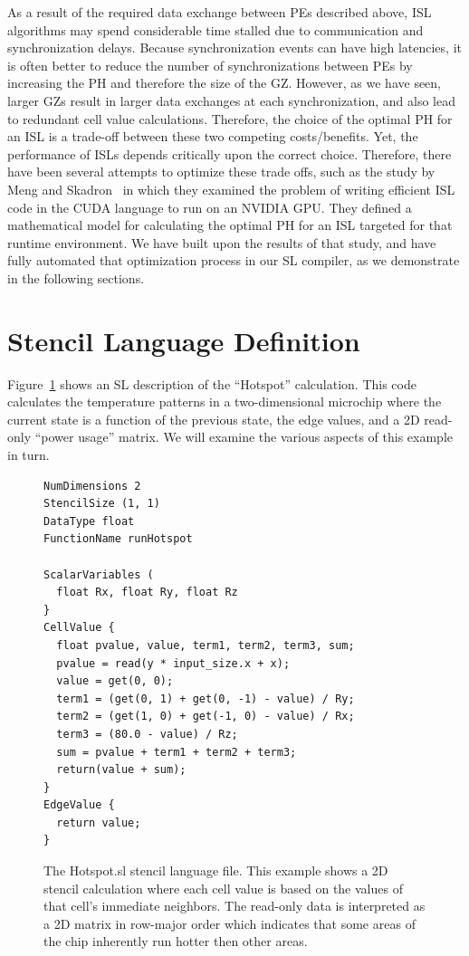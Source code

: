 \documentclass[preprint,nocopyrightspace]{styles/sigplanconf}
\begin{document}
As a result of the required data exchange between PEs described above, ISL
algorithms may spend considerable time stalled due to communication and
synchronization delays.  Because synchronization events can have high
latencies, it is often better to reduce the number of synchronizations between
PEs by increasing the PH and therefore the size of the GZ.  However, as we have
seen, larger GZs result in larger data exchanges at each synchronization, and
also lead to redundant cell value calculations.  Therefore, the choice of the optimal PH
for an ISL is a trade-off between these two competing costs/benefits.  Yet, the
performance of ISLs depends critically upon the correct choice.  Therefore, 
there have been several attempts to optimize these trade offs, such as the 
study by Meng and Skadron~\cite{meng} in which they examined the
problem of writing efficient ISL code in the CUDA language to run on an NVIDIA
GPU.  They defined a mathematical model for calculating the optimal PH for an
ISL targeted for that runtime environment.  We have built upon the results of that
study, and have fully automated that optimization process in our SL compiler, 
as we demonstrate in the following sections. 

\section{Stencil Language Definition}

Figure~\ref{fig:hotspot} shows an SL description of the ``Hotspot''
calculation.  This code calculates the temperature patterns in a
two-dimensional microchip where the current state is a function of the previous
state, the edge values, and a 2D read-only ``power usage'' matrix.
We will examine the various aspects of this example in turn.

\begin{figure}
\begin{footnotesize}
\begin{verbatim}
NumDimensions 2
StencilSize (1, 1)
DataType float
FunctionName runHotspot

ScalarVariables (
  float Rx, float Ry, float Rz
}
CellValue {
  float pvalue, value, term1, term2, term3, sum;
  pvalue = read(y * input_size.x + x);
  value = get(0, 0);
  term1 = (get(0, 1) + get(0, -1) - value) / Ry;
  term2 = (get(1, 0) + get(-1, 0) - value) / Rx;
  term3 = (80.0 - value) / Rz;
  sum = pvalue + term1 + term2 + term3;
  return(value + sum);
}
EdgeValue {
  return value;
}
\end{verbatim}
\end{footnotesize}
\caption{The Hotspot.sl stencil language file.  This example
  shows a 2D stencil calculation where
  each cell value is based on the values of that cell's
  immediate neighbors.  The read-only data is interpreted as a
  2D matrix in row-major order which indicates 
  that some areas of the chip inherently run hotter then other areas.}
\label{fig:hotspot} 
\end{figure}
\end{document}
